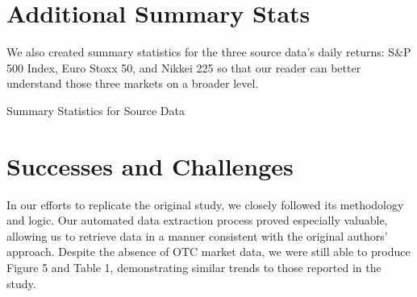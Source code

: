 \documentclass{article}
\begin{document}
\section{Additional Summary Stats}
We also created summary statistics for the three source data's daily returns: S\&P 500 Index, Euro Stoxx 50, and Nikkei 225 so that
our reader can better understand those three markets on a broader level. 

\begin{table}[H]
  \centering
  \caption{Summary Statistics for Source Data}
  
  \label{tab:table3}
  \end{table}


\raggedright
\section{Successes and Challenges}
In our efforts to replicate the original study, we closely followed its methodology and logic. Our automated data extraction process proved especially valuable, allowing us to retrieve data in a manner consistent with the original authors’ approach. Despite the absence of OTC market data, we were still able to produce Figure 5 and Table 1, demonstrating similar trends to those reported in the study.



\end{document}
